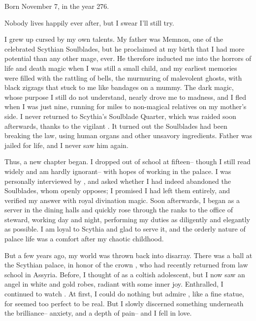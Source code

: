 \documentclass[char]{Kos}
\begin{document}
\name{\cButler{}}

Born November 7, in the year 276.

Nobody lives happily ever after, but I swear I'll still try.

I grew up cursed by my own talents. My father was Memnon, one of the celebrated Scythian Soulblades, but he proclaimed at my birth that I had more potential than any other mage, ever. He therefore inducted me into the horrors of life and death magic when I was still a small child, and my earliest memories were filled with the rattling of bells, the murmuring of malevolent ghosts, with black zigzags that stuck to me like bandages on a mummy. The dark magic, whose purpose I still do not understand, nearly drove me to madness, and I fled when I was just nine, running for miles to non-magical relatives on my mother's side. I never returned to Scythia's Soulblade Quarter, which was raided soon afterwards, thanks to the vigilant \cScythiaQueen{\Monarch} \cScythiaQueen{}. It turned out the Soulblades had been breaking the law, using human organs and other unsavory ingredients. Father was jailed for life, and I never saw him again.

Thus, a new chapter began. I dropped out of school at fifteen-- though I still read widely and am hardly ignorant-- with hopes of working in the palace. I was personally interviewed by \cScythiaQueen{\Monarch} \cScythiaQueen{}, and \cScythiaQueen{\they} asked whether I had indeed abandoned the Soulblades, whom \cScythiaQueen{\they} openly opposes; I promised I had left them entirely, and \cScythiaQueen{\they} verified my answer with royal divination magic. Soon afterwards, I began as a server in the dining halls and quickly rose through the ranks to the office of steward, working day and night, performing my duties as diligently and elegantly as possible. I am loyal to Scythia and glad to serve it, and the orderly nature of palace life was a comfort after my chaotic childhood.

But a few years ago, my world was thrown back into disarray. There was a ball at the Scythian palace, in honor of the crown \cBride{\prince} \cBride{}, who had recently returned from law school in Assyria. Before, I thought of \cBride{\them} as a coltish adolescent, but I now saw an angel in white and gold robes, radiant with some inner joy. Enthralled, I continued to watch \cBride{\them}. At first, I could do nothing but admire \cBride{\them}, like a fine statue, for \cBride{\they} seemed too perfect to be real. But I slowly discerned something underneath the brilliance-- anxiety, and a depth of pain-- and I fell in love. 
\end{document}
